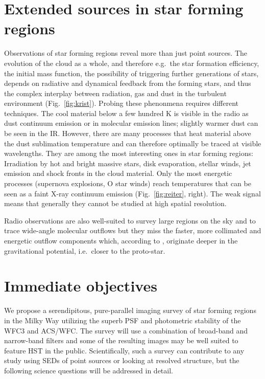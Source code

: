 \documentclass[12pt]{article}
\begin{document}
\section{Extended sources in star forming regions}
Observations of star forming regions reveal more than just point sources. The evolution of the
cloud as a whole, and therefore e.g.\ the star formation efficiency, the initial mass function, the possibility of triggering further generations of stars, depends on radiative and dynamical feedback from the forming stars, and thus the complex interplay between radiation, gas and dust in the turbulent environment (Fig.~\ref{fig:krist}). Probing these phenonmena requires different techniques. The
cool material below a few hundred K is visible in the radio as dust continuum
emission or in molecular emission lines; slightly warmer dust can be seen in
the IR. However, there are many processes that heat material above the dust
sublimation temperature and can therefore optimally be traced at visible wavelengths. 
They are among the most interesting ones in star forming regions:
Irradiation by hot and bright massive stars, disk evaporation, stellar winds,
jet emission and shock fronts in the cloud material. Only the most energetic
processes (supernova explosions, O star winds) reach temperatures that can be seen as a faint
X-ray continuum emission (Fig.~\ref{fig:reiter}, right). The weak signal means that generally they 
cannot be studied at high spatial resolution.

Radio observations are also well-suited to survey large regions on the sky and to
trace wide-angle molecular outflows \citep[e.g.][]{2003MNRAS.341..707C} but
they miss the faster, more collimated and energetic outflow components which, according to \citep{2003ApJ...590L.107A}, originate
deeper in the gravitational potential, i.e.\ closer to the proto-star.


\section{Immediate objectives}
We propose a serendipitous, pure-parallel imaging survey of star forming regions in the Milky Way utilizing the superb PSF and photometric stability of the WFC3 and ACS/WFC. The survey will use a combination of broad-band and narrow-band filters and some of the resulting images may be well suited to feature HST in the public.
Scientifically, such a survey can contribute to any study using SEDs of point sources or looking at resolved structure, but the following science questions will be addressed in detail.
\end{document}
